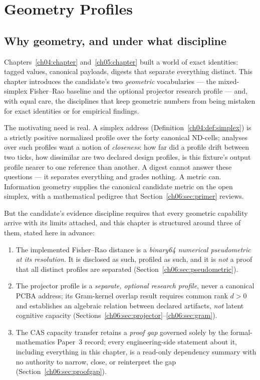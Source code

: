 \chapter{Geometry Profiles}\label{ch06:chapter}

\section{Why geometry, and under what discipline}\label{ch06:sec:intro}

Chapters~\ref{ch04:chapter} and~\ref{ch05:chapter} built a world of exact
identities: tagged values, canonical payloads, digests that separate
everything distinct. This chapter introduces the candidate's two
\emph{geometric} vocabularies --- the mixed-simplex Fisher--Rao baseline
and the optional projector research profile --- and, with equal care, the
disciplines that keep geometric numbers from being mistaken for exact
identities or for empirical findings.

The motivating need is real. A simplex address
(Definition~\ref{ch04:def:simplex}) is a strictly positive normalized
profile over the forty canonical ND-cells; analyses over such profiles
want a notion of \emph{closeness}: how far did a profile drift between
two ticks, how dissimilar are two declared design profiles, is this
fixture's output profile nearer to one reference than another. A
digest cannot answer these questions --- it separates everything and
grades nothing. A metric can. Information geometry supplies the
canonical candidate metric on the open simplex, with a mathematical
pedigree \cite{fisher,rao,amari,ay} that Section~\ref{ch06:sec:primer}
reviews.

But the candidate's evidence discipline requires that every geometric
capability arrive with its limits attached, and this chapter is
structured around three of them, stated here in advance:

\begin{enumerate}
\item The implemented Fisher--Rao distance is a \emph{binary64 numerical
pseudometric at its resolution}. It is disclosed as such, profiled as
such, and it is \emph{not} a proof that all distinct profiles are
separated (Section~\ref{ch06:sec:pseudometric}).
\item The projector profile is a \emph{separate, optional research
profile}, never a canonical PCBA address; its Gram-kernel overlap result
requires common rank $d > 0$ and establishes an algebraic relation
between declared artifacts, \emph{not} latent cognitive capacity
(Sections~\ref{ch06:sec:projector}--\ref{ch06:sec:gram}).
\item The CAS capacity transfer retains a \emph{proof gap} governed
solely by the formal-mathematics Paper~3 record; every engineering-side
statement about it, including everything in this chapter, is a read-only
dependency summary with no authority to narrow, close, or reinterpret
the gap (Section~\ref{ch06:sec:proofgap}).
\end{enumerate}

